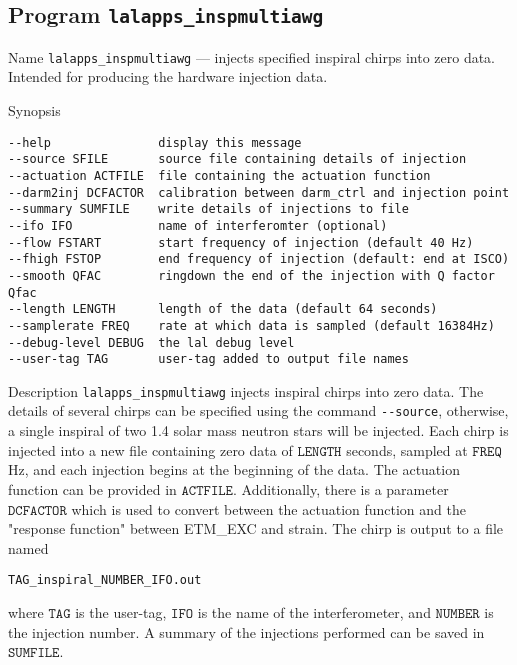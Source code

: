\subsection{Program \texttt{lalapps\_inspmultiawg}}
\label{program:lalapps-inspmultiawg}

\begin{entry}
\item[Name]
\verb$lalapps_inspmultiawg$ --- injects specified inspiral chirps into zero
data.  Intended for producing the hardware injection data.

\item[Synopsis]
\begin{verbatim}
--help               display this message
--source SFILE       source file containing details of injection
--actuation ACTFILE  file containing the actuation function
--darm2inj DCFACTOR  calibration between darm_ctrl and injection point
--summary SUMFILE    write details of injections to file
--ifo IFO            name of interferomter (optional)
--flow FSTART        start frequency of injection (default 40 Hz)
--fhigh FSTOP        end frequency of injection (default: end at ISCO)
--smooth QFAC        ringdown the end of the injection with Q factor Qfac
--length LENGTH      length of the data (default 64 seconds)
--samplerate FREQ    rate at which data is sampled (default 16384Hz)
--debug-level DEBUG  the lal debug level
--user-tag TAG       user-tag added to output file names
\end{verbatim}

\item[Description] 
\verb$lalapps_inspmultiawg$ injects inspiral chirps into zero data.  The 
details of several chirps can be specified using the command \verb$--source$,  
otherwise, a single inspiral of two 1.4 solar mass neutron stars will be 
injected.  Each chirp is injected into a new file containing zero data of
$\texttt{LENGTH}$ seconds, sampled at $\texttt{FREQ}$ Hz, and each injection begins at the beginning of the data.  The actuation function can be provided in
$\texttt{ACTFILE}$.  Additionally, there is a parameter $\texttt{DCFACTOR}$ 
which is used to convert between the actuation function and the "response 
function" between ETM\_EXC and strain.  The chirp is output to a file
named
\begin{verbatim}
TAG_inspiral_NUMBER_IFO.out
\end{verbatim}
where $\texttt{TAG}$ is the user-tag, $\texttt{IFO}$ is the name of the 
interferometer, and $\texttt{NUMBER}$ is the injection number.  A summary of
the injections performed can be saved in $\texttt{SUMFILE}$.


\end{entry}
